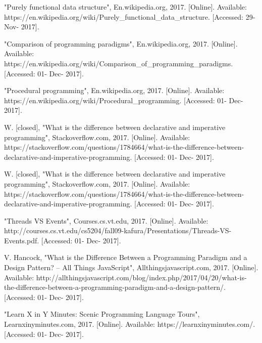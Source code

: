 \documentclass[conference]{IEEEtran}
\begin{document}
\begin{thebibliography}{00}
 "Purely functional data structure", En.wikipedia.org, 2017. [Online]. Available: https://en.wikipedia.org/wiki/Purely\_functional\_data\_structure. [Accessed: 29- Nov- 2017].

 "Comparison of programming paradigms", En.wikipedia.org, 2017. [Online]. Available: https://en.wikipedia.org/wiki/Comparison\_of\_programming\_paradigms. [Accessed: 01- Dec- 2017].

 "Procedural programming", En.wikipedia.org, 2017. [Online]. Available: https://en.wikipedia.org/wiki/Procedural\_programming. [Accessed: 01- Dec- 2017].

 W. [closed], "What is the difference between declarative and imperative programming", Stackoverflow.com, 2017. [Online]. Available: https://stackoverflow.com/questions/1784664/what-is-the-difference-between-declarative-and-imperative-programming. [Accessed: 01- Dec- 2017].

 W. [closed], "What is the difference between declarative and imperative programming", Stackoverflow.com, 2017. [Online]. Available: https://stackoverflow.com/questions/1784664/what-is-the-difference-between-declarative-and-imperative-programming. [Accessed: 01- Dec- 2017].

 "Threads VS Events", Courses.cs.vt.edu, 2017. [Online]. Available: http://courses.cs.vt.edu/cs5204/fall09-kafura/Presentations/Threads-VS-Events.pdf. [Accessed: 01- Dec- 2017].

 V. Hancock, "What is the Difference Between a Programming Paradigm and a Design Pattern? – All Things JavaScript", Allthingsjavascript.com, 2017. [Online]. Available: http://allthingsjavascript.com/blog/index.php/2017/04/20/what-is-the-difference-between-a-programming-paradigm-and-a-design-pattern/. [Accessed: 01- Dec- 2017].

 "Learn X in Y Minutes: Scenic Programming Language Tours", Learnxinyminutes.com, 2017. [Online]. Available: https://learnxinyminutes.com/. [Accessed: 01- Dec- 2017].

\end{thebibliography}
\end{document}
